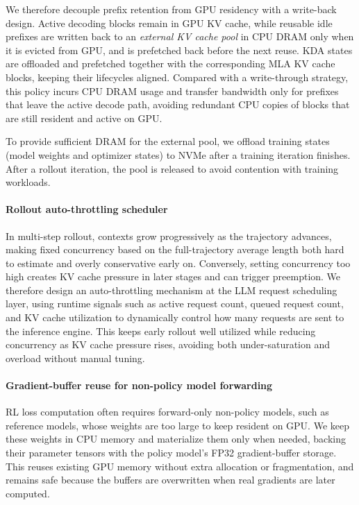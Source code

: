 We therefore decouple prefix retention from GPU residency with a write-back design.
Active decoding blocks remain in GPU KV cache, while reusable idle prefixes are written back to an \textit{external KV cache pool} in CPU DRAM only when it is evicted from GPU, and is prefetched back before the next reuse.
KDA states are offloaded and prefetched together with the corresponding MLA KV cache blocks, keeping their lifecycles aligned.
Compared with a write-through strategy, this policy incurs CPU DRAM usage and transfer bandwidth only for prefixes that leave the active decode path, avoiding redundant CPU copies of blocks that are still resident and active on GPU.

To provide sufficient DRAM for the external pool, we offload training states (model weights and optimizer states) to NVMe after a training iteration finishes. After a rollout iteration, the pool is released to avoid contention with training workloads.

\paragraph{Rollout auto-throttling scheduler}
In multi-step rollout, contexts grow progressively as the trajectory advances, making fixed concurrency based on the full-trajectory average length both hard to estimate and overly conservative early on.
Conversely, setting concurrency too high creates KV cache pressure in later stages and can trigger preemption.
We therefore design an auto-throttling mechanism at the LLM request scheduling layer, using runtime signals such as active request count, queued request count, and KV cache utilization to dynamically control how many requests are sent to the inference engine.
This keeps early rollout well utilized while reducing concurrency as KV cache pressure rises, avoiding both under-saturation and overload without manual tuning.

\paragraph{Gradient-buffer reuse for non-policy model forwarding}
RL loss computation often requires forward-only non-policy models, such as reference models, whose weights are too large to keep resident on GPU.
We keep these weights in CPU memory and materialize them only when needed, backing their parameter tensors with the policy model's FP32 gradient-buffer storage.
This reuses existing GPU memory without extra allocation or fragmentation, and remains safe because the buffers are overwritten when real gradients are later computed.

